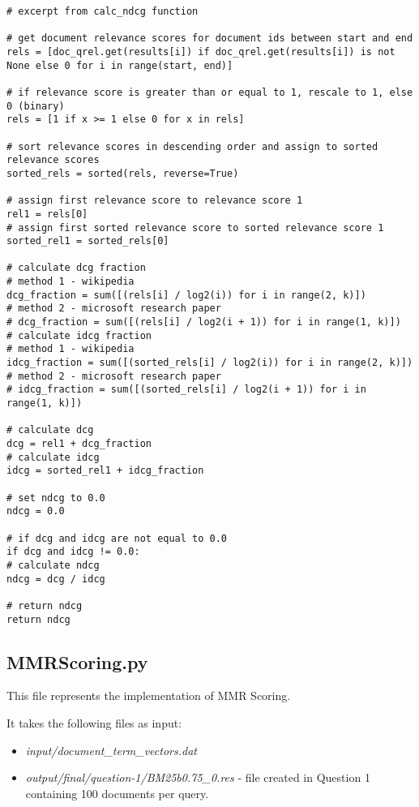 \documentclass{article} %
\begin{document}
\begin{lstlisting}[style=Python]
# excerpt from calc_ndcg function

# get document relevance scores for document ids between start and end
rels = [doc_qrel.get(results[i]) if doc_qrel.get(results[i]) is not None else 0 for i in range(start, end)]

# if relevance score is greater than or equal to 1, rescale to 1, else 0 (binary)
rels = [1 if x >= 1 else 0 for x in rels]

# sort relevance scores in descending order and assign to sorted relevance scores
sorted_rels = sorted(rels, reverse=True)

# assign first relevance score to relevance score 1
rel1 = rels[0]
# assign first sorted relevance score to sorted relevance score 1
sorted_rel1 = sorted_rels[0]

# calculate dcg fraction
# method 1 - wikipedia
dcg_fraction = sum([(rels[i] / log2(i)) for i in range(2, k)])
# method 2 - microsoft research paper
# dcg_fraction = sum([(rels[i] / log2(i + 1)) for i in range(1, k)])
# calculate idcg fraction
# method 1 - wikipedia
idcg_fraction = sum([(sorted_rels[i] / log2(i)) for i in range(2, k)])
# method 2 - microsoft research paper
# idcg_fraction = sum([(sorted_rels[i] / log2(i + 1)) for i in range(1, k)])

# calculate dcg
dcg = rel1 + dcg_fraction
# calculate idcg
idcg = sorted_rel1 + idcg_fraction

# set ndcg to 0.0
ndcg = 0.0

# if dcg and idcg are not equal to 0.0
if dcg and idcg != 0.0:
# calculate ndcg
ndcg = dcg / idcg

# return ndcg
return ndcg
\end{lstlisting}

\subsection*{MMRScoring.py \cite{carbonell1998use}}

This file represents the implementation of MMR Scoring.

It takes the following files as input:

\begin{itemize}
    \item \textit{input/document\_term\_vectors.dat}
    \item \textit{output/final/question-1/BM25b0.75\_0.res} - file created in Question 1 containing 100 documents per query.
\end{itemize}
\end{document}
